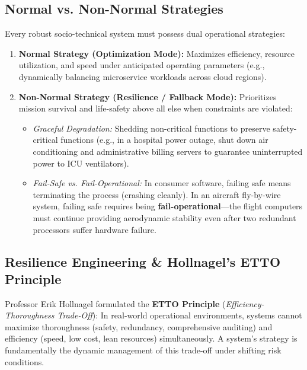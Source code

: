 \subsection{Normal vs. Non-Normal Strategies}
Every robust socio-technical system must possess dual operational strategies:
\begin{enumerate}[leftmargin=2em]
    \item \textbf{Normal Strategy (Optimization Mode):} Maximizes efficiency, resource utilization, and speed under anticipated operating parameters (e.g., dynamically balancing microservice workloads across cloud regions).
    \item \textbf{Non-Normal Strategy (Resilience / Fallback Mode):} Prioritizes mission survival and life-safety above all else when constraints are violated:
    \begin{itemize}
        \item \textit{Graceful Degradation:} Shedding non-critical functions to preserve safety-critical functions (e.g., in a hospital power outage, shut down air conditioning and administrative billing servers to guarantee uninterrupted power to ICU ventilators).
        \item \textit{Fail-Safe vs. Fail-Operational:} In consumer software, failing safe means terminating the process (crashing cleanly). In an aircraft fly-by-wire system, failing safe requires being \textbf{fail-operational}—the flight computers must continue providing aerodynamic stability even after two redundant processors suffer hardware failure.
    \end{itemize}
\end{enumerate}

\subsection{Resilience Engineering \& Hollnagel's ETTO Principle}
Professor Erik Hollnagel formulated the \textbf{ETTO Principle} (\textit{Efficiency-Thoroughness Trade-Off}): In real-world operational environments, systems cannot maximize thoroughness (safety, redundancy, comprehensive auditing) and efficiency (speed, low cost, lean resources) simultaneously. A system's strategy is fundamentally the dynamic management of this trade-off under shifting risk conditions.


